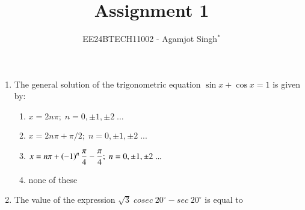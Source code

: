 \documentclass[journal,12pt,twocolumn]{IEEEtran}
\theoremstyle{remark}
\begin{document}

\title{Assignment 1}
\author{EE24BTECH11002 - Agamjot Singh$^{*}$%
}
\maketitle
\newpage
\bigskip

\begin{enumerate}

\section*{\color{black}\colorbox{gray}{ C. }\color{white}\colorbox{magenta}{MCQs with One Correct Answer}}
    \setcounter{enumi}{4}

    \item The general solution of the trigonometric equation $\sin {x} + \cos{x} = 1$ is given by:
        
        \begin{enumerate}[label={(\alph*)}]
            \item $x = 2n\pi;\;n = 0,\pm1,\pm2\;...$
            \item $x = 2n\pi+\pi/2;\;n = 0,\pm1,\pm2\;...$
            \item $x = n\pi+\left(-1\right)^n\dfrac{\pi}{4}-\dfrac{\pi}{4};\;n = 0,\pm1,\pm2\;...$
            \item none of these
        \end{enumerate}

    \item The value of the expression $\sqrt{3}\;cosec\;20^\circ-sec\;20^\circ$ is equal to
        
        \begin{enumerate}[label={(\alph*)}]
        \end{enumerate}
        

\end{enumerate}
\end{document}
